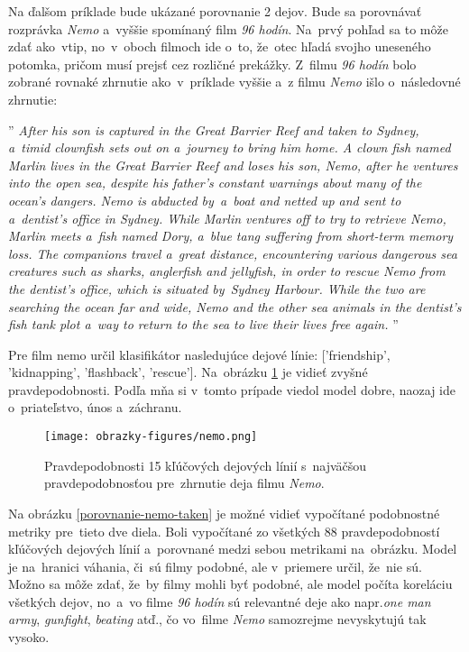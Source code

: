 Na ďalšom príklade bude ukázané porovnanie 2 dejov. Bude sa porovnávať rozprávka \textit{Nemo} a~vyššie spomínaný film \textit{96 hodín}. Na~prvý pohľad sa to môže zdať ako~vtip, no~v~oboch filmoch ide o~to, že~otec hľadá svojho uneseného potomka, pričom musí prejsť cez rozličné prekážky. Z~filmu \textit{96 hodín} bolo zobrané rovnaké zhrnutie ako~v~príklade vyššie a~z filmu \textit{Nemo} išlo o~následovné zhrnutie:

\noindent''\textit{
After his son is captured in the Great Barrier Reef and taken to Sydney, a~timid clownfish sets out on a~journey to bring him home. A clown fish named Marlin lives in the Great Barrier Reef and loses his son, Nemo, after he ventures into the open sea, despite his father's constant warnings about many of the ocean's dangers. Nemo is abducted by~a~boat and netted up and sent to a~dentist's office in Sydney. While Marlin ventures off to try to retrieve Nemo, Marlin meets a~fish named Dory, a~blue tang suffering from short-term memory loss. The companions travel a~great distance, encountering various dangerous sea creatures such as sharks, anglerfish and jellyfish, in order to rescue Nemo from the dentist's office, which is situated by~Sydney Harbour. While the two are searching the ocean far and wide, Nemo and the other sea animals in the dentist's fish tank plot a~way to return to the sea to live their lives free again.
}''

Pre film nemo určil klasifikátor nasledujúce dejové línie: ['friendship', 'kidnapping', 'flashback', 'rescue']. Na~obrázku \ref{nemo} je vidieť zvyšné pravdepodobnosti. Podľa mňa si v~tomto prípade viedol model dobre, naozaj ide o~priateľstvo, únos a~záchranu. 

\begin{figure}[ht!]
	\centering
	\texttt{[image: obrazky-figures/nemo.png]}
	\caption{Pravdepodobnosti 15 kľúčových dejových línií s~najväčšou pravdepodobnosťou pre~zhrnutie deja filmu \textit{Nemo}.}
	\label{nemo}
\end{figure}

Na obrázku \ref{porovnanie-nemo-taken} je možné vidieť vypočítané podobnostné metriky pre~tieto dve diela. Boli vypočítané zo všetkých 88 pravdepodobností kľúčových dejových línií a~porovnané medzi sebou metrikami na~obrázku. Model je na~hranici váhania, či~sú filmy podobné, ale v~priemere určil, že~nie sú. Možno sa môže zdať, že~by filmy mohli byť podobné, ale model počíta koreláciu všetkých dejov, no~a~vo filme \textit{96 hodín} sú relevantné deje ako napr.\textit{one man army}, \textit{gunfight}, \textit{beating} atď., čo vo~filme \textit{Nemo} samozrejme nevyskytujú tak vysoko. 

